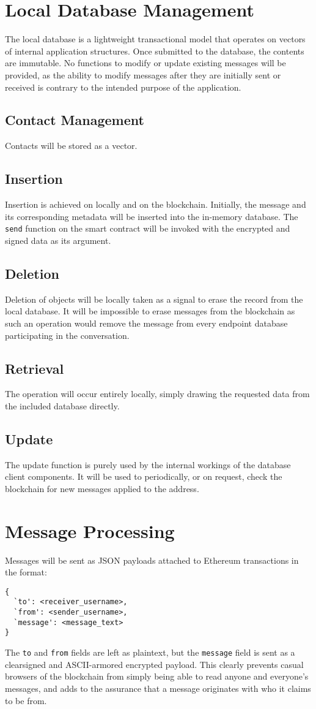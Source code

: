 \documentclass[]{article}
\begin{document}
\section{Local Database Management}
The local database is a lightweight transactional model that operates on vectors of internal application structures. Once submitted to the database, the contents are immutable. No functions to modify or update existing messages will be provided, as the ability to modify messages after they are initially sent or received is contrary to the intended purpose of the application.
\subsection{Contact Management}
Contacts will be stored as a vector.
\subsection{Insertion}
Insertion is achieved on locally and on the blockchain. Initially, the message and its corresponding metadata will be inserted into the in-memory database. The \verb!send! function on the smart contract will be invoked with the encrypted and signed data as its argument. 
\subsection{Deletion}
Deletion of objects will be locally taken as a signal to erase the record from the local database. It will be impossible to erase messages from the blockchain as such an operation would remove the message from every endpoint database participating in the conversation.
\subsection{Retrieval}
The operation will occur entirely locally, simply drawing the requested data from the included database directly.
\subsection{Update}
The update function is purely used by the internal workings of the database client components. It will be used to periodically, or on request, check the blockchain for new messages applied to the address.

\section{Message Processing}
Messages will be sent as JSON payloads attached to Ethereum transactions in the format:
\begin{verbatim}
{
  `to': <receiver_username>,
  `from': <sender_username>,
  `message': <message_text>
}
\end{verbatim}
The \verb!to! and \verb!from! fields are left as plaintext, but the \verb!message! field is sent as a clearsigned and ASCII-armored encrypted payload. This clearly prevents casual browsers of the blockchain from simply being able to read anyone and everyone's messages, and adds to the assurance that a message originates with who it claims to be from.
\end{document}
